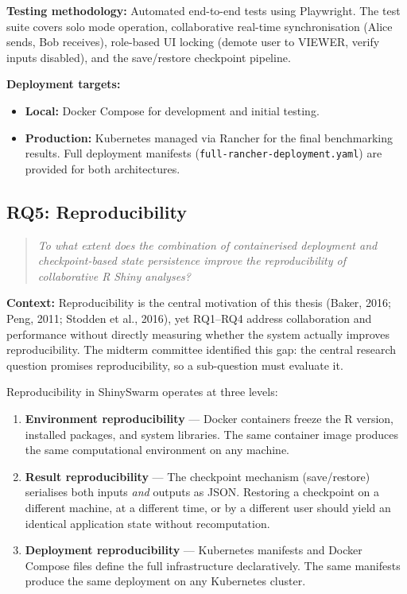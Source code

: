 \documentclass[12pt,a4paper]{article}
\begin{document}
\textbf{Testing methodology:} Automated end-to-end tests using Playwright. The test suite covers solo mode operation, collaborative real-time synchronisation (Alice sends, Bob receives), role-based UI locking (demote user to VIEWER, verify inputs disabled), and the save/restore checkpoint pipeline.

\textbf{Deployment targets:}
\begin{itemize}[nosep]
  \item \textbf{Local:} Docker Compose for development and initial testing.
  \item \textbf{Production:} Kubernetes managed via Rancher for the final benchmarking results. Full deployment manifests (\texttt{full-rancher-deployment.yaml}) are provided for both architectures.
\end{itemize}

\subsection{RQ5: Reproducibility}

\begin{quote}
\textit{To what extent does the combination of containerised deployment and checkpoint-based state persistence improve the reproducibility of collaborative R Shiny analyses?}
\end{quote}

\textbf{Context:} Reproducibility is the central motivation of this thesis (Baker, 2016; Peng, 2011; Stodden et al., 2016), yet RQ1--RQ4 address collaboration and performance without directly measuring whether the system actually improves reproducibility. The midterm committee identified this gap: the central research question promises reproducibility, so a sub-question must evaluate it.

Reproducibility in ShinySwarm operates at three levels:

\begin{enumerate}[nosep]
  \item \textbf{Environment reproducibility} --- Docker containers freeze the R version, installed packages, and system libraries. The same container image produces the same computational environment on any machine.
  \item \textbf{Result reproducibility} --- The checkpoint mechanism (save/restore) serialises both inputs \textit{and} outputs as JSON. Restoring a checkpoint on a different machine, at a different time, or by a different user should yield an identical application state without recomputation.
  \item \textbf{Deployment reproducibility} --- Kubernetes manifests and Docker Compose files define the full infrastructure declaratively. The same manifests produce the same deployment on any Kubernetes cluster.
\end{enumerate}
\end{document}
